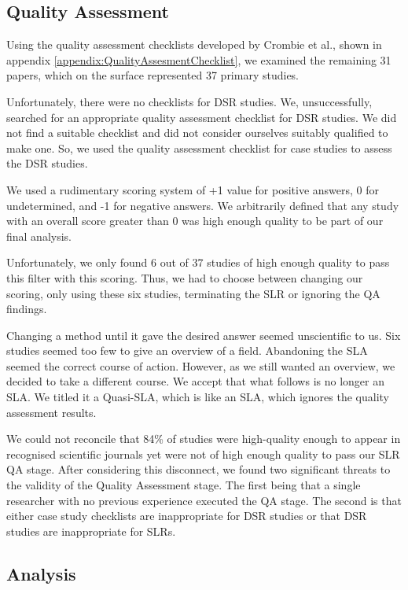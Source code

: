 \subsection{Quality Assessment}
Using the quality assessment checklists developed by Crombie et al.\cite{crombie1997pocket}, shown in appendix \ref{appendix:QualityAssesmentChecklist}, we examined the remaining 31 papers, which on the surface represented 37 primary studies.

Unfortunately, there were no checklists for DSR studies.
We, unsuccessfully, searched for an appropriate quality assessment checklist for DSR studies.
We did not find a suitable checklist and did not consider ourselves suitably qualified to make one.
So, we used the quality assessment checklist for case studies to assess the DSR studies.

We used a rudimentary scoring system of +1 value for positive answers, 0 for undetermined, and -1 for negative answers.
We arbitrarily defined that any study with an overall score greater than 0 was high enough quality to be part of our final analysis.

Unfortunately, we only found 6 out of 37 studies of high enough quality to pass this filter with this scoring.
Thus, we had to choose between changing our scoring, only using these six studies, terminating the SLR or ignoring the QA findings.

Changing a method until it gave the desired answer seemed unscientific to us.
Six studies seemed too few to give an overview of a field.
Abandoning the SLA seemed the correct course of action.
However, as we still wanted an overview, we decided to take a different course.
We accept that what follows is no longer an SLA. 
We titled it a Quasi-SLA, which is like an SLA, which ignores the quality assessment results.

We could not reconcile that 84\% of studies were high-quality enough to appear in recognised scientific journals yet were not of high enough quality to pass our SLR QA stage.
After considering this disconnect, we found two significant threats to the validity of the Quality Assessment stage.
The first being that a single researcher with no previous experience executed the QA stage.
The second is that either case study checklists are inappropriate for DSR studies or that DSR studies are inappropriate for SLRs.

\subsection{Analysis}
\label{section:slr_analysis}

